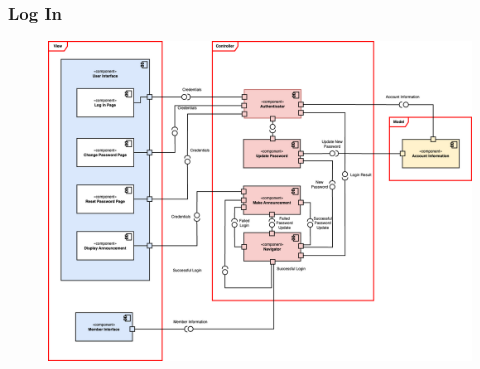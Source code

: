 	\subsubsection{Log In}
        \begin{center}
        \begin{figure}[!htp]
        \begin{center}
         \includegraphics[scale=0.31]{images/Task3/Component Diagrams/ComponentDiagramLogin.drawio.png}
        \end{center}
        \end{figure}
        \end{center}

